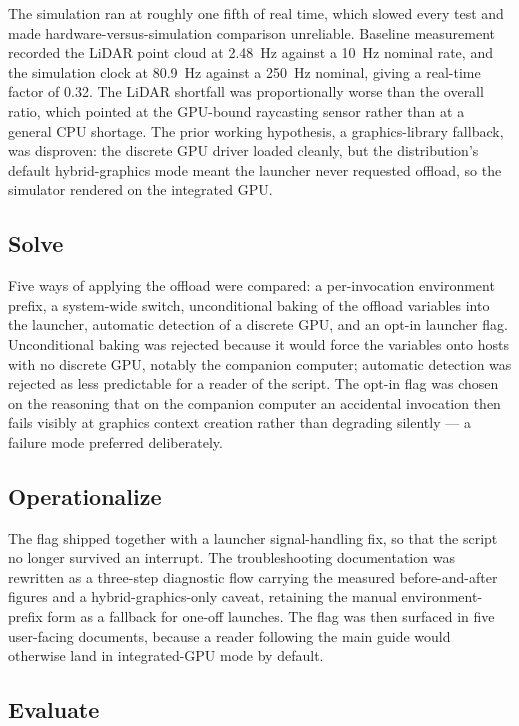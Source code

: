 \documentclass[a4paper,12pt,oneside,openany]{report}
\begin{document}
The simulation ran at roughly one fifth of real time, which slowed every test and made
hardware-versus-simulation comparison unreliable. Baseline measurement recorded the LiDAR point
cloud at 2.48~Hz against a 10~Hz nominal rate, and the simulation clock at 80.9~Hz against a 250~Hz
nominal, giving a real-time factor of 0.32. The LiDAR shortfall was proportionally worse than the
overall ratio, which pointed at the GPU-bound raycasting sensor rather than at a general CPU
shortage. The prior working hypothesis, a graphics-library fallback, was disproven: the discrete
GPU driver loaded cleanly, but the distribution's default hybrid-graphics mode meant the launcher
never requested offload, so the simulator rendered on the integrated GPU.

\subsection{Solve}

Five ways of applying the offload were compared: a per-invocation environment prefix, a system-wide
switch, unconditional baking of the offload variables into the launcher, automatic detection of a
discrete GPU, and an opt-in launcher flag. Unconditional baking was rejected because it would force
the variables onto hosts with no discrete GPU, notably the companion computer; automatic detection
was rejected as less predictable for a reader of the script. The opt-in flag was chosen on the
reasoning that on the companion computer an accidental invocation then fails visibly at graphics
context creation rather than degrading silently --- a failure mode preferred deliberately.

\subsection{Operationalize}

The flag shipped together with a launcher signal-handling fix, so that the script no longer survived
an interrupt. The troubleshooting documentation was rewritten as a three-step diagnostic flow
carrying the measured before-and-after figures and a hybrid-graphics-only caveat, retaining the
manual environment-prefix form as a fallback for one-off launches. The flag was then surfaced in
five user-facing documents, because a reader following the main guide would otherwise land in
integrated-GPU mode by default.

\subsection{Evaluate}
\end{document}

